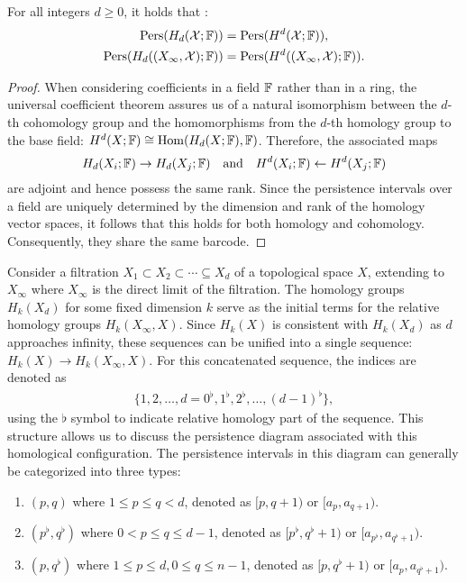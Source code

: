 \begin{theorem}
For all integers $d \geq 0$, it holds that \cite[\S 2.3]{de2011dualities}:
\begin{align}
\mathrm{Pers}(H_{d}(\mathcal{X};{\mathbb{F}})) &= \mathrm{Pers}(H^{d}(\mathcal{X};{\mathbb{F}})), \\
\mathrm{Pers}(H_{d}((X_{\infty}, \mathcal{X});{\mathbb{F}})) &= \mathrm{Pers}(H^{d}((X_{\infty}, \mathcal{X});{\mathbb{F}})).
\end{align}
\end{theorem}

\begin{proof}
When considering coefficients in a field ${\mathbb{F}}$ rather than in a ring, the universal coefficient theorem assures us of a natural isomorphism between the $d$-th cohomology group and the homomorphisms from the $d$-th homology group to the base field: $H^{d}(X; {\mathbb{F}}) \cong \operatorname{Hom}(H_{d}(X; {\mathbb{F}}), {\mathbb{F}})$. Therefore, the associated maps
\begin{equation}
H_{d}(X_{i}; {\mathbb{F}}) \rightarrow H_{d}(X_{j}; {\mathbb{F}}) \quad \text{and} \quad H^{d}(X_{i}; {\mathbb{F}}) \leftarrow H^{d}(X_{j}; {\mathbb{F}})
\end{equation}
are adjoint and hence possess the same rank. Since the persistence intervals over a field are uniquely determined by the dimension and rank of the homology vector spaces, it follows that this holds for both homology and cohomology. Consequently, they share the same barcode.
\end{proof}

Consider a filtration $X_{1} \subset X_{2} \subset \cdots \subseteq X_{d}$ of a topological space $X$, extending to $X_{\infty}$ where $X_{\infty}$ is the direct limit of the filtration. The homology groups $H_{k}(X_{d})$ for some fixed dimension $k$ serve as the initial terms for the relative homology groups $H_{k}(X_{\infty}, X)$. Since $H_{k}(X)$ is consistent with $H_{k}(X_{d})$ as $d$ approaches infinity, these sequences can be unified into a single sequence: $H_{k}(X) \to H_{k}(X_{\infty}, X)$. For this concatenated sequence, the indices are denoted as
\begin{align}
\{1, 2, \ldots, d = 0^{\flat}, 1^{\flat}, 2^{\flat}, \ldots, (d-1)^{\flat}\},
\end{align}
using the $\flat$ symbol to indicate relative homology part of the sequence. This structure allows us to discuss the persistence diagram associated with this homological configuration. The persistence intervals in this diagram can generally be categorized into three types:
\begin{enumerate}
	\item $(p, q)$ where $1 \leq p \leq q < d$, denoted as $[p, q+1)$ or $[a_{p}, a_{q+1})$.
	\item $(p^{\flat}, q^{\flat})$ where $0 < p \leq q \leq d-1$, denoted as $[p^{\flat}, q^{\flat}+1)$ or $[a_{p^\flat}, a_{q^\flat+1})$.
	\item $(p, q^{\flat})$ where $1 \leq p \leq d, 0 \leq q \leq n-1$, denoted as $[p, q^{\flat}+1)$ or $[a_{p}, a_{q^\flat+1})$.
\end{enumerate}

